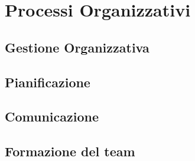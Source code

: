 \section{Processi Organizzativi}
	\subsection{Gestione Organizzativa}
	\subsection{Pianificazione}
	\subsection{Comunicazione}
	\subsection{Formazione del team}